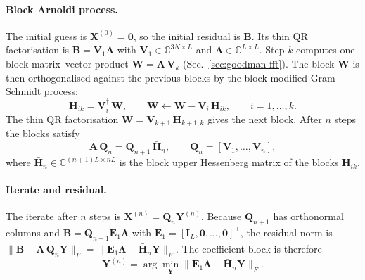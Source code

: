 \documentclass[11pt,a4paper]{article}
\begin{document}
\paragraph{Block Arnoldi process.}
The initial guess is $\mathbf{X}^{(0)} = \mathbf{0}$, so the initial
residual is $\mathbf{B}$.
Its thin QR factorisation is
$\mathbf{B} = \mathbf{V}_1 \boldsymbol{\Lambda}$ with
$\mathbf{V}_1 \in \mathbb{C}^{3N \times L}$ and
$\boldsymbol{\Lambda} \in \mathbb{C}^{L \times L}$.
Step $k$ computes one block matrix--vector product
$\mathbf{W} = \mathbf{A}\,\mathbf{V}_k$ (Sec.~\ref{sec:goodman-fft}).
The block $\mathbf{W}$ is then orthogonalised against the previous
blocks by the block modified Gram--Schmidt process:
\begin{equation}
  \mathbf{H}_{ik} = \mathbf{V}_i^\dagger\,\mathbf{W},
  \qquad
  \mathbf{W} \leftarrow \mathbf{W} - \mathbf{V}_i\,\mathbf{H}_{ik},
  \qquad i = 1, \ldots, k .
  \label{eq:block-gram-schmidt}
\end{equation}
The thin QR factorisation
$\mathbf{W} = \mathbf{V}_{k+1}\,\mathbf{H}_{k+1,k}$ gives the next
block.
After $n$ steps the blocks satisfy
\begin{equation}
  \mathbf{A}\,\mathbf{Q}_n = \mathbf{Q}_{n+1}\,\bar{\mathbf{H}}_n,
  \qquad
  \mathbf{Q}_n = [\mathbf{V}_1, \ldots, \mathbf{V}_n],
  \label{eq:block-arnoldi-full}
\end{equation}
where $\bar{\mathbf{H}}_n \in \mathbb{C}^{(n+1)L \times nL}$ is the
block upper Hessenberg matrix of the blocks $\mathbf{H}_{ik}$.

\paragraph{Iterate and residual.}
The iterate after $n$ steps is
$\mathbf{X}^{(n)} = \mathbf{Q}_n \mathbf{Y}^{(n)}$.
Because $\mathbf{Q}_{n+1}$ has orthonormal columns and
$\mathbf{B} = \mathbf{Q}_{n+1} \mathbf{E}_1 \boldsymbol{\Lambda}$ with
$\mathbf{E}_1 = [\mathbf{I}_L, \mathbf{0}, \ldots, \mathbf{0}]^\top$,
the residual norm is
$\| \mathbf{B} - \mathbf{A}\,\mathbf{Q}_n \mathbf{Y} \|_F
 = \| \mathbf{E}_1 \boldsymbol{\Lambda}
      - \bar{\mathbf{H}}_n \mathbf{Y} \|_F$.
The coefficient block is therefore
\begin{equation}
  \mathbf{Y}^{(n)}
    = \arg\min_{\mathbf{Y}}
      \bigl\| \mathbf{E}_1 \boldsymbol{\Lambda}
        - \bar{\mathbf{H}}_n \mathbf{Y} \bigr\|_F .
  \label{eq:gmres-lsq}
\end{equation}
\end{document}

